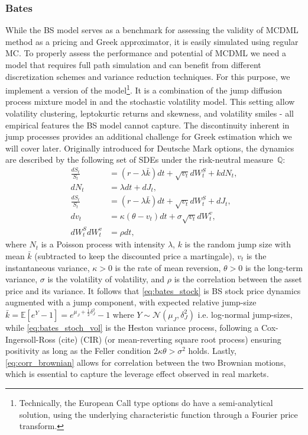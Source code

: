 \subsubsection{Bates} \label{sec:bates}

While the BS model serves as a benchmark for assessing the validity of MCDML method as a pricing and Greek approximator, it is easily simulated using regular MC. To properly assess the performance and potential of MCDML we need a model that requires full path simulation and can benefit from different discretization schemes and variance reduction techniques. For this purpose, we implement a version of the \textcite{batesJumpsStochasticVolatility1996} model\footnote{Technically, the European Call type options do have a semi-analytical solution, using the underlying characteristic function through a Fourier price transform.}. It is a combination of the jump diffusion process mixture model in \textcite{mertonOptionPricingWhen1976} and the \textcite{hestonClosedFormSolutionOptions1993} stochastic volatility model. This setting allow volatility clustering, leptokurtic returns and skewness, and volatility smiles - all empirical features the BS model cannot capture. The discontinuity inherent in jump processes provides an additional challenge for Greek estimation which we will cover later. Originally introduced for Deutsche Mark options, the dynamics are described by the following set of SDEs under the risk-neutral measure~$\mathbb{Q}$:
\begin{align}
    \frac{d S_t}{S_t} &= (r - \lambda \bar{k})dt + \sqrt{v_t}dW_t^S + k dN_t, \label{eq:bates_stock} \\
    dN_t &= \lambda dt + dJ_t, \\
    \frac{d S_t}{S_t} &= (r - \lambda \bar{k})dt + \sqrt{v_t}dW_t^S + dJ_t, \\
    dv_t &= \kappa(\theta - v_t)dt + \sigma\sqrt{v_t}dW_t^v, \label{eq:bates_stoch_vol} \\
    dW_t^S dW_t^v &= \rho dt, \label{eq:corr_brownian}
\end{align}
where $N_t$ is a Poisson process with intensity $\lambda$, $k$ is the random jump size with mean $\bar{k}$ (subtracted to keep the discounted price a martingale), $v_t$ is the instantaneous variance, $\kappa > 0$ is the rate of mean reversion, $\theta >0 $ is the long-term variance, $\sigma$ is the volatility of volatility, and $\rho$ is the correlation between the asset price and its variance. It follows that \eqref{eq:bates_stock} is BS stock price dynamics augmented with a jump component, with expected relative jump-size $\bar{k} = \mathbb{E}[e^Y-1]=e^{\mu_J + \frac{1}{2}\delta_J^2}-1$ where $Y \sim \mathcal{N}(\mu_J, \delta^2_J)$ i.e. log-normal jump-sizes, while \eqref{eq:bates_stoch_vol} is the Heston variance process, following a Cox-Ingersoll-Ross (cite) (CIR) (or mean-reverting square root process) ensuring positivity as long as the Feller condition $2\kappa \theta > \sigma^2$ holds. Lastly, \eqref{eq:corr_brownian} allows for correlation between the two Brownian motions, which is essential to capture the leverage effect observed in real markets.


